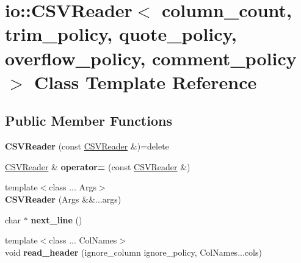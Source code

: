 \hypertarget{classio_1_1CSVReader}{}\section{io\+:\+:C\+S\+V\+Reader$<$ column\+\_\+count, trim\+\_\+policy, quote\+\_\+policy, overflow\+\_\+policy, comment\+\_\+policy $>$ Class Template Reference}
\label{classio_1_1CSVReader}
\subsection*{Public Member Functions}
\begin{DoxyCompactItemize}
\item 
\mbox{\label{classio_1_1CSVReader_a0507ac5abe201969a15df76795e13c28}} 
{\bfseries C\+S\+V\+Reader} (const \hyperlink{classio_1_1CSVReader}{C\+S\+V\+Reader} \&)=delete
\item 
\mbox{\label{classio_1_1CSVReader_a37046e6629cf4254037c14440f14141d}} 
\hyperlink{classio_1_1CSVReader}{C\+S\+V\+Reader} \& {\bfseries operator=} (const \hyperlink{classio_1_1CSVReader}{C\+S\+V\+Reader} \&)
\item 
\mbox{\label{classio_1_1CSVReader_a189debf95672e7cd7582e9f73d7203e5}} 
{\footnotesize template$<$class ... Args$>$ }\\{\bfseries C\+S\+V\+Reader} (Args \&\&...args)
\item 
\mbox{\label{classio_1_1CSVReader_a9fec7797cb27f64360cc48adc5f32c72}} 
char $\ast$ {\bfseries next\+\_\+line} ()
\item 
\mbox{\label{classio_1_1CSVReader_a9fad9ae02aa243dba6bc78156c5ce7e5}} 
{\footnotesize template$<$class ... Col\+Names$>$ }\\void {\bfseries read\+\_\+header} (ignore\+\_\+column ignore\+\_\+policy, Col\+Names...\+cols)
\item 
\mbox{\label{classio_1_1CSVReader_ab68eedff1bd59a49fa4ddb160dff94e0}} 

\end{DoxyCompactItemize}
